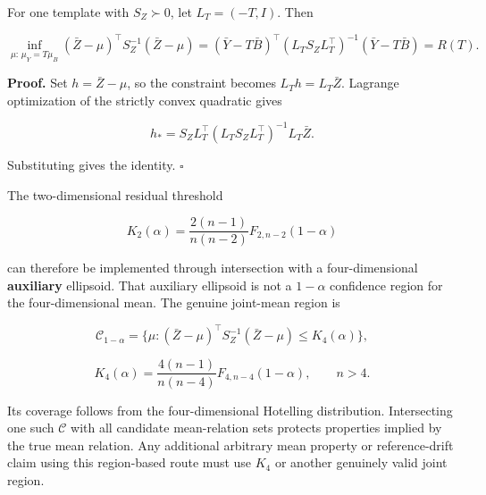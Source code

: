 \documentclass[11pt,a4paper]{article}
\begin{document}
\par
\noindent\begin{minipage}{\linewidth}

For one template with \(S_Z\succ0\), let \(L_T=(-T,I)\). Then

\[
\inf_{\mu:\,\mu_Y=T\mu_B}
(\bar Z-\mu)^\top S_Z^{-1}(\bar Z-\mu)
=
(\bar Y-T\bar B)^\top
(L_TS_ZL_T^\top)^{-1}
(\bar Y-T\bar B)
=R(T).
\]

\end{minipage}\par

\par
\noindent\begin{minipage}{\linewidth}

\textbf{Proof.} Set \(h=\bar Z-\mu\), so the constraint becomes
\(L_Th=L_T\bar Z\). Lagrange optimization of the strictly convex
quadratic gives

\[
h_*=S_ZL_T^\top(L_TS_ZL_T^\top)^{-1}L_T\bar Z.
\]

\end{minipage}\par

Substituting gives the identity. \(\square\)

\par
\noindent\begin{minipage}{\linewidth}

The two-dimensional residual threshold

\[
K_2(\alpha)=\frac{2(n-1)}{n(n-2)}F_{2,n-2}(1-\alpha)
\]

\end{minipage}\par

\par
\noindent\begin{minipage}{\linewidth}

can therefore be implemented through intersection with a
four-dimensional \textbf{auxiliary} ellipsoid. That auxiliary ellipsoid
is not a \(1-\alpha\) confidence region for the four-dimensional mean.
The genuine joint-mean region is

\[
\mathcal C_{1-\alpha}
=\{\mu:(\bar Z-\mu)^\top S_Z^{-1}(\bar Z-\mu)\le K_4(\alpha)\},
\]

\end{minipage}\par

\[
K_4(\alpha)=\frac{4(n-1)}{n(n-4)}F_{4,n-4}(1-\alpha),
\qquad n>4.
\]

Its coverage follows from the four-dimensional Hotelling distribution.
Intersecting one such \(\mathcal C\) with all candidate mean-relation
sets protects properties implied by the true mean relation. Any
additional arbitrary mean property or reference-drift claim using this
region-based route must use \(K_4\) or another genuinely valid joint
region.
\end{document}
